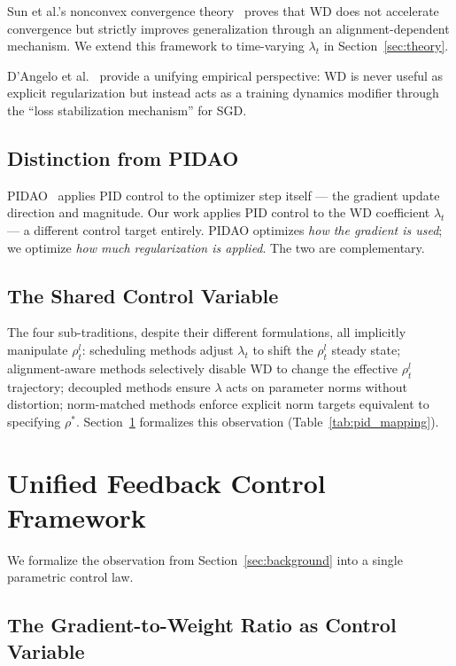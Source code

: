 \documentclass{article}
\begin{document}
Sun et al.'s nonconvex convergence theory~\citep{sun2025convergence} proves that WD does not accelerate convergence but strictly improves generalization through an alignment-dependent mechanism. We extend this framework to time-varying $\lambda_t$ in Section~\ref{sec:theory}.

D'Angelo et al.~\citep{dangelo2024wd} provide a unifying empirical perspective: WD is never useful as explicit regularization but instead acts as a training dynamics modifier through the ``loss stabilization mechanism'' for SGD.

\subsection{Distinction from PIDAO}

PIDAO~\citep{pidao2024} applies PID control to the optimizer step itself --- the gradient update direction and magnitude. Our work applies PID control to the WD coefficient $\lambda_t$ --- a different control target entirely. PIDAO optimizes \textit{how the gradient is used}; we optimize \textit{how much regularization is applied}. The two are complementary.

\subsection{The Shared Control Variable}

The four sub-traditions, despite their different formulations, all implicitly manipulate $\rho_t^l$: scheduling methods adjust $\lambda_t$ to shift the $\rho_t^l$ steady state; alignment-aware methods selectively disable WD to change the effective $\rho_t^l$ trajectory; decoupled methods ensure $\lambda$ acts on parameter norms without distortion; norm-matched methods enforce explicit norm targets equivalent to specifying $\rho^*$. Section~\ref{sec:framework} formalizes this observation (Table~\ref{tab:pid_mapping}).

\section{Unified Feedback Control Framework}
\label{sec:framework}

We formalize the observation from Section~\ref{sec:background} into a single parametric control law.

\subsection{The Gradient-to-Weight Ratio as Control Variable}
\end{document}
